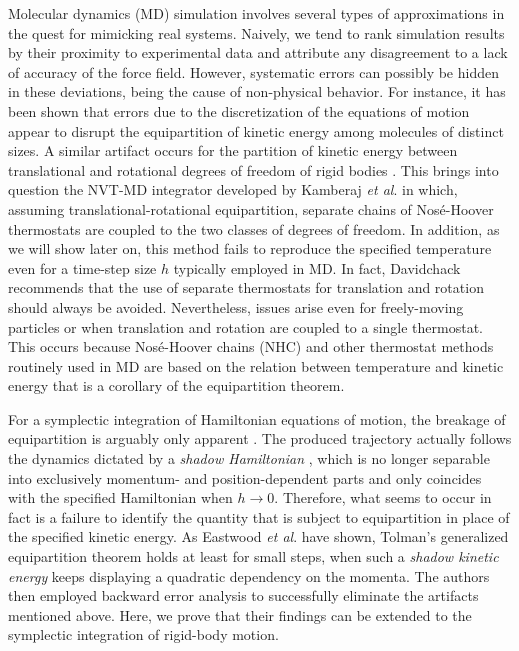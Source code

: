 \documentclass[
	aip,
	jcp,
	reprint,
]{revtex4-1}
\newcommand{\timestep}{h}
\begin{document}
Molecular dynamics (MD) simulation involves several types of approximations in the quest for mimicking real systems.
Naively, we tend to rank simulation results by their proximity to experimental data and attribute any disagreement to a lack of accuracy of the force field.
However, systematic errors can possibly be hidden in these deviations, being the cause of non-physical behavior.
For instance, it has been shown \cite{Eastwood_2010} that errors due to the discretization of the equations of motion appear to disrupt the equipartition of kinetic energy among molecules of distinct sizes.
A similar artifact occurs for the partition of kinetic energy between translational and rotational degrees of freedom of rigid bodies \cite{Davidchack_2010, Silveira_2017}.
This brings into question the NVT-MD integrator developed by Kamberaj \textit{et al}. \cite{Kamberaj_2005} in which, assuming translational-rotational equipartition, separate chains of Nos\'{e}-Hoover thermostats are coupled to the two classes of degrees of freedom.
In addition, as we will show later on, this method fails to reproduce the specified temperature even for a time-step size $\timestep$ typically employed in MD.
In fact, Davidchack \cite{Davidchack_2010} recommends that the use of separate thermostats for translation and rotation should always be avoided.
Nevertheless, issues arise even for freely-moving particles or when translation and rotation are coupled to a single thermostat.
This occurs because Nos\'{e}-Hoover chains (NHC) \cite{Martyna_1992} and other thermostat methods routinely used in MD are based on the relation between temperature and kinetic energy that is a corollary of the equipartition theorem.

For a symplectic integration of Hamiltonian equations of motion, the breakage of equipartition is arguably only apparent \cite{Eastwood_2010}.
The produced trajectory actually follows the dynamics dictated by a \textit{shadow Hamiltonian} \cite{Tuckerman_2010}, which is no longer separable into exclusively momentum- and position-dependent parts and only coincides with the specified Hamiltonian when $\timestep \to 0$.
Therefore, what seems to occur in fact is a failure to identify the quantity that is subject to equipartition in place of the specified kinetic energy.
As Eastwood \textit{et al}. \cite{Eastwood_2010} have shown, Tolman's generalized equipartition theorem \cite{Tolman_1918} holds at least for small steps, when such a \textit{shadow kinetic energy} keeps displaying a quadratic dependency on the momenta.
The authors then employed backward error analysis to successfully eliminate the artifacts mentioned above.
Here, we prove that their findings can be extended to the symplectic integration of rigid-body motion.
\end{document}
